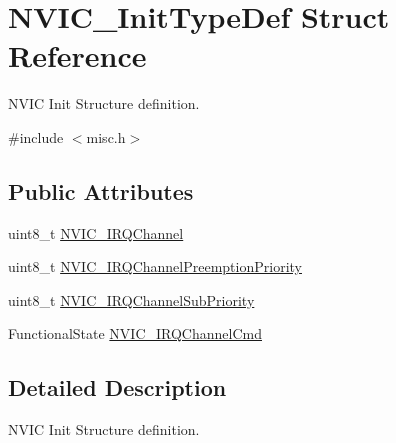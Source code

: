 \hypertarget{structNVIC__InitTypeDef}{
\section{NVIC\_\-InitTypeDef Struct Reference}
\label{structNVIC__InitTypeDef}
}


NVIC Init Structure definition.  




{\ttfamily \#include $<$misc.h$>$}

\subsection*{Public Attributes}
\begin{DoxyCompactItemize}
\item 
uint8\_\-t \hyperlink{structNVIC__InitTypeDef_afa04cf6e559bb690bdd9fcb7e3d93dcf}{NVIC\_\-IRQChannel}
\item 
uint8\_\-t \hyperlink{structNVIC__InitTypeDef_aa3fe262c30188404a6e31f922c5ae513}{NVIC\_\-IRQChannelPreemptionPriority}
\item 
uint8\_\-t \hyperlink{structNVIC__InitTypeDef_aecc22a002244e3f1f9448dbe46c1db4b}{NVIC\_\-IRQChannelSubPriority}
\item 
FunctionalState \hyperlink{structNVIC__InitTypeDef_acb23fabb995fa4980c768825f12f5815}{NVIC\_\-IRQChannelCmd}
\end{DoxyCompactItemize}


\subsection{Detailed Description}
NVIC Init Structure definition. 


